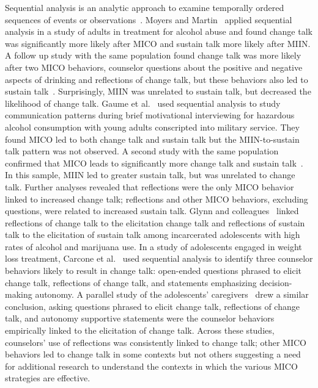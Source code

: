 Sequential analysis is an analytic approach to examine temporally ordered sequences of events or observations~\cite{bakeman1997observing, bakeman2011sequential}. Moyers and Martin~\cite{moyers2006therapist} applied sequential analysis in a study of adults in treatment for alcohol abuse and found change talk was significantly more likely after MICO and sustain talk more likely after MIIN. A follow up study with the same population found change talk was more likely after two MICO behaviors, counselor questions about the positive and negative aspects of drinking and reflections of change talk, but these behaviors also led to sustain talk~\cite{moyers2009session}. Surprisingly, MIIN was unrelated to sustain talk, but decreased the likelihood of change talk. Gaume et al.~\cite{gaume2008counsellor} used sequential analysis to study communication patterns during brief motivational interviewing for hazardous alcohol consumption with young adults conscripted into military service. They found MICO led to both change talk and sustain talk but the MIIN-to-sustain talk pattern was not observed. A second study with the same population confirmed that MICO leads to significantly more change talk and sustain talk~\cite{gaume2010counselor}. In this sample, MIIN led to greater sustain talk, but was unrelated to change talk. Further analyses revealed that reflections were the only MICO behavior linked to increased change talk; reflections and other MICO behaviors, excluding questions, were related to increased sustain talk. Glynn and colleagues~\cite{glynn2014change} linked reflections of change talk to the elicitation change talk and reflections of sustain talk to the elicitation of sustain talk among incarcerated adolescents with high rates of alcohol and marijuana use. In a study of adolescents engaged in weight loss treatment, Carcone et al.~\cite{carcone2013provider} used sequential analysis to identify three counselor behaviors likely to result in change talk: open-ended questions phrased to elicit change talk, reflections of change talk, and statements emphasizing decision-making autonomy. A parallel study of the adolescents’ caregivers~\cite{jacques2016building} drew a similar conclusion, asking questions phrased to elicit change talk, reflections of change talk, and autonomy supportive statements were the counselor behaviors empirically linked to the elicitation of change talk. Across these studies, counselors’ use of reflections was consistently linked to change talk; other MICO behaviors led to change talk in some contexts but not others suggesting a need for additional research to understand the contexts in which the various MICO strategies are effective. 

